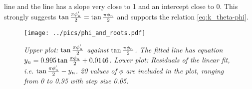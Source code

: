 line and the line has a slope very close to 1 and an intercept close to
0. This strongly suggests $\tan{\pi \phi'_n \over 2} = \tan{\pi \phi_n
  \over 2}$ and supports the relation \ref{eq:k_theta-phi}.
\begin{figure}[htb!]
  \centering
    \texttt{[image: ../pics/phi\_and\_roots.pdf]}
  \caption{\small \it Upper plot: $\tan{\pi \phi'_n \over 2}$ against
    $\tan{\pi \phi_n \over 2}$. The fitted line has equation $y_n =
    0.995 \tan{\pi \phi_n \over 2} + 0.0146$. Lower plot: Residuals of
    the linear fit, i.e. $\tan{\pi \phi'_n \over 2} - y_n$. 20 values
    of $\phi$ are included in the plot, ranging from 0 to 0.95 with
    step size 0.05.}
  \label{fig:phi_and_roots}
\end{figure}




